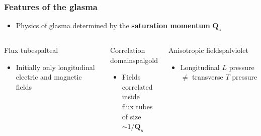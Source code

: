 \documentclass[aspectratio=169,11pt,usenames,dvipsnames]{beamer}
\begin{document}
\begin{frame}
    \frametitle{Features of the glasma}
    \begin{itemize}\itemsep0em 
        \item \begin{center}Physics of glasma determined by the {\bfseries saturation momentum} $\boldsymbol{Q_s}$\end{center}
    \end{itemize}
    \vspace{-10pt}
    \begin{columns}[onlytextwidth,t]

        \begin{custombox2}{{\normalsize Flux tubes}}{palteal}
            \begin{varwidth}{0.99\columnwidth}
            \begin{itemize}\itemsep0em 
                \scriptsize
                \item Initially only longitudinal electric and magnetic fields
            \end{itemize}
            \end{varwidth}
        \end{custombox2}

       \begin{custombox2}{{\normalsize Correlation domains}}{palgold}
            \begin{varwidth}{0.99\columnwidth}
            \begin{itemize}\itemsep0em 
                \scriptsize
                \item Fields correlated inside\\ flux tubes of size $\sim 1/\boldsymbol{Q_s}$ 
            \end{itemize}
            \end{varwidth}
        \end{custombox2}

        \begin{custombox2}{{\normalsize Anisotropic fields}}{palviolet}
            \begin{varwidth}{0.95\columnwidth}
            \begin{itemize}\itemsep0em 
                \scriptsize
                \item Longitudinal $L$ pressure $\neq$ transverse $T$ pressure
            \end{itemize}
            \end{varwidth}
        \end{custombox2}
 

\end{columns}
\end{frame}
\end{document}
